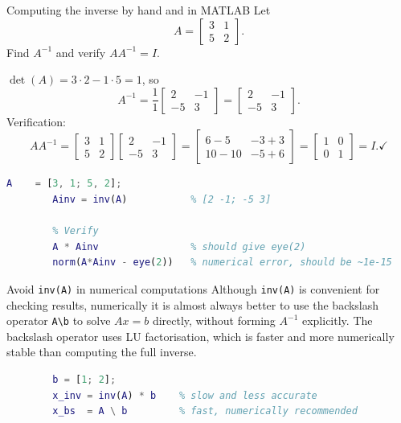 \begin{examplebox}{Computing the inverse by hand and in MATLAB}
	Let
	\[
	A = \begin{bmatrix} 3 & 1 \\ 5 & 2 \end{bmatrix}.
	\]
	Find $A^{-1}$ and verify $AA^{-1} = I$.
	
	\solution
	$\det(A) = 3\cdot2 - 1\cdot5 = 1$, so
	\[
	A^{-1} = \frac{1}{1}
	\begin{bmatrix} 2 & -1 \\ -5 & 3 \end{bmatrix}
	= \begin{bmatrix} 2 & -1 \\ -5 & 3 \end{bmatrix}.
	\]
	Verification:
	\[
	AA^{-1} =
	\begin{bmatrix} 3 & 1 \\ 5 & 2 \end{bmatrix}
	\begin{bmatrix} 2 & -1 \\ -5 & 3 \end{bmatrix}
	=
	\begin{bmatrix} 6-5 & -3+3 \\ 10-10 & -5+6 \end{bmatrix}
	= \begin{bmatrix} 1 & 0 \\ 0 & 1 \end{bmatrix} = I. \checkmark
	\]
	
	\begin{lstlisting}[language=Matlab]
		A    = [3, 1; 5, 2];
		Ainv = inv(A)           % [2 -1; -5 3]
		
		% Verify
		A * Ainv                % should give eye(2)
		norm(A*Ainv - eye(2))   % numerical error, should be ~1e-15
	\end{lstlisting}
\end{examplebox}

\begin{alertbox}{Avoid \texttt{inv(A)} in numerical computations}
	Although \texttt{inv(A)} is convenient for checking results,
	numerically it is almost always better to use the backslash operator
	\texttt{A\textbackslash b} to solve $Ax = b$
	directly, without forming $A^{-1}$ explicitly.  The backslash
	operator uses LU factorisation, which is faster and more numerically
	stable than computing the full inverse.
	
	\begin{lstlisting}[language=Matlab]
		% Solve Ax = b
		b = [1; 2];
		x_inv = inv(A) * b    % slow and less accurate
		x_bs  = A \ b         % fast, numerically recommended
	\end{lstlisting}
\end{alertbox}

